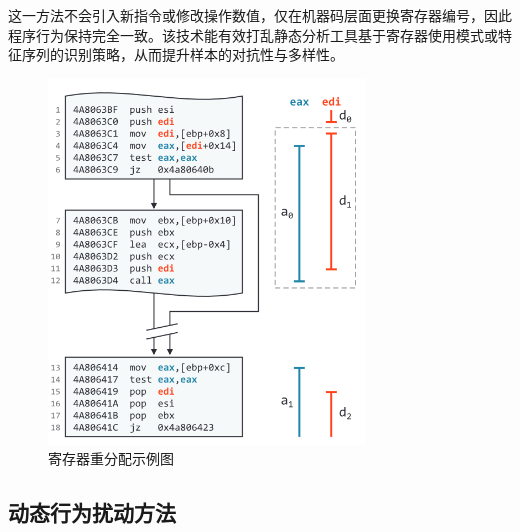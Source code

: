 \begin{enumerate}
这一方法不会引入新指令或修改操作数值，仅在机器码层面更换寄存器编号，因此程序行为保持完全一致。该技术能有效打乱静态分析工具基于寄存器使用模式或特征序列的识别策略，从而提升样本的对抗性与多样性。

\end{enumerate}



\begin{figure}[hbt]
	\centering
	\includegraphics[width=0.75\textwidth]{figures/4.6}
	\caption{寄存器重分配示例图}\label{fig:4.6}
\end{figure}

\subsection{动态行为扰动方法}


